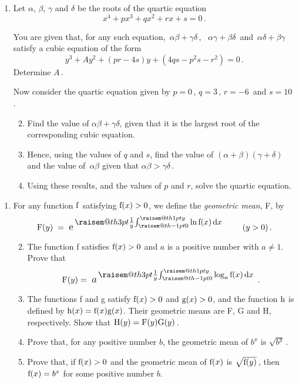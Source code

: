 \documentclass[a4, 11pt]{report}
\makeatletter
\newlength{\qspace}
\newcounter{qnumber}
\newenvironment{question}%
 {\vspace{\qspace}
  \begin{enumerate}[\bfseries 1\quad][10]%
    \setcounter{enumi}{\value{qnumber}}%
    \item%
 }
{
  \end{enumerate}
  \filbreak
  \stepcounter{qnumber}
 }
\newenvironment{questionparts}[1][1]%
 {
  \begin{enumerate}[\bfseries (i)]%
    \setcounter{enumii}{#1}
    \addtocounter{enumii}{-1}
    \setlength{\itemsep}{5mm}
    \setlength{\parskip}{3pt}
 }
 {
  \end{enumerate}
 }
\def\d{{\rm d}}
\def\e{{\rm e}}
\def\g{{\rm g}}
\def\h{{\rm h}}
\def\f{{\rm f}}
\def\F{{\rm F}}
\def\G{{\rm G}}
\def\H{{\rm H}}
\newcommand{\raisemath}[1]{\mathpalette{\raisem@th{#1}}}
\newcommand{\raisem@th}[3]{\raisebox{#1}{$#2#3$}}
\makeatother
\begin{document}
\begin{question}
Let $\alpha$, $\beta$, $\gamma$ and $\delta$ be the roots of the 
quartic equation
\[
x^4 +px^3 +qx^2 +r x +s =0
\,.
\]

You are given that,  
for any such equation, 
  $\,\alpha \beta + \gamma\delta\,$, \, $\alpha\gamma+\beta\delta\,$
and $\,\alpha \delta + \beta\gamma\,$ 
satisfy a 
cubic equation of the form 
\[
y^3+Ay^2+ 
(pr-4s)y+ (4qs-p^2s -r^2)
=0
\,.
\]
Determine  $A\,$.

\vspace{3mm}
Now consider  the quartic equation given by $p=0\,$, $q= 3\,$, $r=-6\,$
and $s=10\,$.
\begin{questionparts}
\item


Find the value of $\alpha\beta + \gamma \delta$,
given that it is the largest root of the corresponding cubic equation.

\item
Hence, using the values of $q$ and $s$, find  
the value of $(\alpha +\beta)(\gamma+\delta)\,$
and
 the value of~$\alpha\beta$ given that $\alpha\beta >\gamma\delta\,$.

\item
Using these results, and the values of $p$ and $r$,
solve the quartic equation.  
\end{questionparts}

\end{question}


\begin{question}
For any 
 function $\f$  satisfying 
$\f(x) > 0$,  we define the  {\em geometric mean}, F,
 by   
\[
\F(y)
\;
= 
\mbox{
\fontsize{12}{15.6}\selectfont
$\e$}
\mbox{ 
\fontsize{14}{15.6}\selectfont
$
^{\!
\raisemath {3pt}
{\frac{1}{y}
\!
\int_{\raisemath{-1pt}{0}}^{\raisemath{1pt}{y}}
 \ln \f(x) \, \d x}
}
$ } 
\ \ \ \ \ \ (y>0)\,.
\]

\begin{questionparts}
\item The function f satisfies 
$\f(x) > 0$ and  
$a$ is a positive number with $a\ne1$. Prove that
\[
\F(y) =
\mbox{
\fontsize{12}{15.6}\selectfont
$a$}
\mbox{ 
\fontsize{14}{15.6}\selectfont
$
^{
\!
\raisemath {3pt}
{\frac{1}{y}
\!
\int_{\raisemath{-1pt}{0}}^{\raisemath{1pt}{y}} 
\log_a  \f(x) \, \d x}
}
$ }
.
\]

\item The functions f and  g satisfy 
$\f(x) > 0$ and $\g(x) > 0$, and  the function $\h$ is 
defined by $\h(x) = \f(x)\g(x)$. Their
 geometric means are F, G and H, respectively.
Show that  $\H(y)= \F(y) \G(y)\,$.

\item Prove that, for any positive number  $b$, 
the geometric mean of  $b^x$ 
is  
$\sqrt{b^y}\,$.

\item Prove that, if $\f(x)>0$ and
 the geometric mean of $\f(x)$ 
is $\sqrt{\f(y)}\,$, 
then $\f(x) = b^x$ for some positive number $b$.

\end{questionparts}
\end{question}
\end{document}
